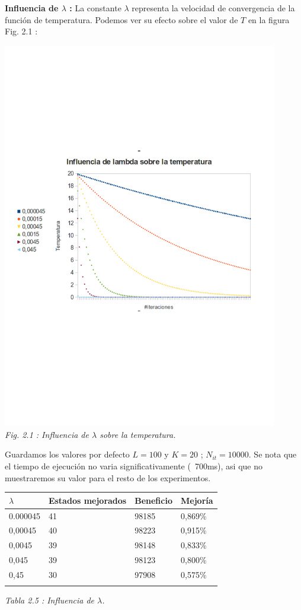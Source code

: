 \documentclass{article}
\begin{document}
\textbf{Influencia de $\lambda$ : }
La constante $\lambda$ representa la velocidad de convergencia de la función de
temperatura. Podemos ver su efecto sobre el valor de $T$ en la figura Fig. 2.1 :
\begin{center}
\includegraphics[width=12cm]{cordero}\\
{\it Fig. 2.1 : Influencia de $\lambda$ sobre la temperatura.}
\end{center}

Guardamos los valores por defecto $L=100$ y $K=20$ ; $N_{it} = 10 000$.
Se nota que el tiempo de ejecución no varia significativamente (~700ms), asi que
no muestraremos su valor para el resto de los experimentos.\\

\begin{center}
\begin{tabular}{|l||l|l|l|}
\hline
$\lambda$ & Estados mejorados & Beneficio & Mejoría\\
\hline
0.000045 & 41 & 98185 & 0,869\%\\
\hline
0,00045 & 40 & 98223 & 0,915\%\\
\hline
0,0045 & 39 & 98148 & 0,833\%\\
\hline
0,045 & 39 & 98123 & 0,800\%\\
\hline
0,45 & 30 & 97908 & 0,575\%\\
\hline\\
\end{tabular}
{\it Tabla 2.5 : Influencia de $\lambda$.}
\end{center}
\end{document}
